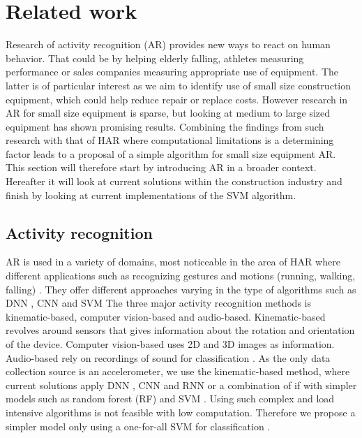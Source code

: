 \section{Related work}
Research of activity recognition (AR) provides new ways to react on human behavior. 
That could be by helping elderly falling, athletes measuring performance or sales companies measuring appropriate use of equipment.
The latter is of particular interest as we aim to identify use of small size construction equipment, which could help reduce repair or replace costs. However research in AR for small size equipment is sparse, but looking at medium to large sized equipment has shown promising results\cite{ConstructionRecognitionFractionalRandomForest,constructionRecognitionMobileSensors,soaWorkersAndEquipment}. Combining the findings from such research with that of HAR \cite{HAR_CNN,DNN_CNN_RNN_HAR,HumanActivityrecognitionAccelerometer,hybridHARSVMCNN} where computational limitations is a determining factor leads to a proposal of a simple algorithm for small size equipment AR. This section will therefore start by introducing AR in a broader context. Hereafter it will look at current solutions within the construction industry and finish by looking at current implementations of the SVM algorithm.
\subsection{Activity recognition}
AR is used in a variety of domains, most noticeable in the area of HAR where different applications such as recognizing gestures and motions (running, walking, falling) \cite{HumanActivityrecognitionAccelerometer, hybridHARSVMCNN,HARsignalprocessing}. 
They offer different approaches varying in the type of algorithms such as DNN \cite{DNN_CNN_RNN_HAR}, CNN \cite{hybridHARSVMCNN} and SVM \cite{hybridHARSVMCNN} 
The three major activity recognition methods is kinematic-based, computer vision-based and audio-based. 
Kinematic-based revolves around sensors that gives information about the rotation and orientation of the device. 
Computer vision-based uses 2D and 3D images as information. 
Audio-based rely on recordings of sound for classification \cite{soaWorkersAndEquipment}. 
As the only data collection source is an accelerometer, we use the kinematic-based method, where current solutions apply DNN \cite{DNN_CNN_RNN_HAR}, CNN \cite{hybridHARSVMCNN} and RNN \cite{DNN_CNN_RNN_HAR} or a combination of if with simpler models such as random forest (RF) and SVM \cite{hybridHARSVMCNN}. 
Using such complex and load intensive algorithms is not feasible with low computation. Therefore we propose a simpler model only using a one-for-all SVM for classification \cite{SVM-one-vs-one-one-vs-all}. 

